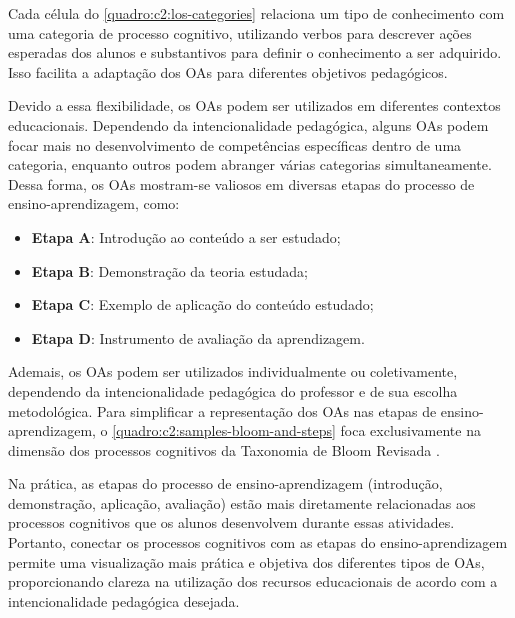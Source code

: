 Cada célula do \autoref{quadro:c2:los-categories} relaciona um tipo de conhecimento com uma categoria de processo cognitivo, utilizando verbos para descrever ações esperadas dos alunos e substantivos para definir o conhecimento a ser adquirido. Isso facilita a adaptação dos OAs para diferentes objetivos pedagógicos.

Devido a essa flexibilidade, os OAs podem ser utilizados em diferentes contextos educacionais. Dependendo da intencionalidade pedagógica, alguns OAs podem focar mais no desenvolvimento de competências específicas dentro de uma categoria, enquanto outros podem abranger várias categorias simultaneamente. Dessa forma, os OAs mostram-se valiosos em diversas etapas do processo de ensino-aprendizagem, como:

\begin{itemize}
\item \textbf{Etapa A}: Introdução ao conteúdo a ser estudado;
\item \textbf{Etapa B}: Demonstração da teoria estudada;
\item \textbf{Etapa C}: Exemplo de aplicação do conteúdo estudado;
\item \textbf{Etapa D}: Instrumento de avaliação da aprendizagem.
\end{itemize}

Ademais, os OAs podem ser utilizados individualmente ou coletivamente, dependendo da intencionalidade pedagógica do professor e de sua escolha metodológica. Para simplificar a representação dos OAs nas etapas de ensino-aprendizagem, o \autoref{quadro:c2:samples-bloom-and-steps} foca exclusivamente na dimensão dos processos cognitivos da Taxonomia de Bloom Revisada \cite{Krathwohl2002}. 

Na prática, as etapas do processo de ensino-aprendizagem (introdução, demonstração, aplicação, avaliação) estão mais diretamente relacionadas aos processos cognitivos que os alunos desenvolvem durante essas atividades. Portanto, conectar os processos cognitivos com as etapas do ensino-aprendizagem permite uma visualização mais prática e objetiva dos diferentes tipos de OAs, proporcionando clareza na utilização dos recursos educacionais de acordo com a intencionalidade pedagógica desejada.

